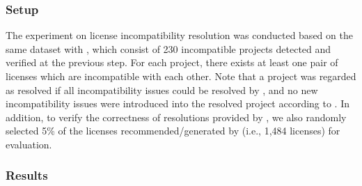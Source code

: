\subsubsection{{Setup}}
The experiment on license incompatibility resolution was conducted based on the same dataset with , which consist of {230} incompatible projects detected and verified at the previous step. For each project, there exists at least one pair of licenses which are incompatible with each other. Note that a project was regarded as resolved if all incompatibility issues could be resolved by \tool, and no new incompatibility issues were introduced into the resolved project according to \tool. In addition, to verify the correctness of resolutions provided by \tool, we also randomly selected {5\%} of the licenses recommended/generated by \tool (i.e., {1,484} licenses) for evaluation. %


\subsubsection{{Results}}

